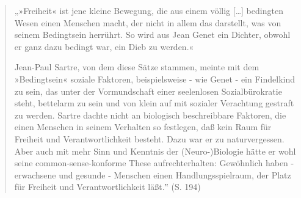 \documentclass[
  a4paper,
]{report}
\begin{document}
\begin{quote}
„»Freiheit« ist jene kleine Bewegung, die aus einem völlig {[}\ldots{]} bedingten Wesen einen Menschen macht, der nicht in allem das darstellt, was von seinem Bedingtsein herrührt. So wird aus Jean Genet ein Dichter, obwohl er ganz dazu bedingt war, ein Dieb zu werden.«

Jean-Paul Sartre, von dem diese Sätze stammen, meinte mit dem »Bedingtsein« soziale Faktoren, beispielsweise - wie Genet - ein Findelkind zu sein, das unter der Vormundschaft einer seelenlosen Sozialbürokratie steht, bettelarm zu sein und von klein auf mit sozialer Verachtung gestraft zu werden. Sartre dachte nicht an biologisch beschreibbare Faktoren, die einen Menschen in seinem Verhalten so festlegen, daß kein Raum für Freiheit und Verantwortlichkeit besteht. Dazu war er zu naturvergessen. Aber auch mit mehr Sinn und Kenntnis der (Neuro-)Biologie hätte er wohl seine common-sense-konforme These aufrechterhalten: Gewöhnlich haben - erwachsene und gesunde - Menschen einen Handlungsspielraum, der Platz für Freiheit und Verantwortlichkeit läßt.‟ (S. 194)
\end{quote}
\end{document}
